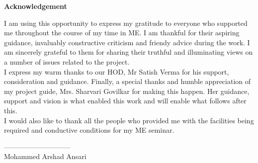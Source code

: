 \documentclass[12pt]{book}
\begin{document}
\begin{center}

	\vspace{30mm}
    \fontsize{24}{60}\selectfont \textbf{Acknowledgement}\\
    \vspace{20mm}

		
	\fontsize{12}{20}\selectfont \raggedright{I am using this opportunity to express my gratitude to everyone who supported me throughout the course of my time in ME. I am thankful for their aspiring guidance, invaluably constructive criticism and friendy advice during the work. I am sincerely grateful to them for sharing their truthful and illuminating views on a number of issues related to the project.}\\
    \vspace{10mm}
	I express my warm thanks to our HOD, Mr Satish Verma for his support, consideration and guidance.
	Finally, a special thanks and humble appreciation of my project guide, Mrs. Sharvari Govilkar for making this happen. Her guidance, support and vision is what enabled this work and will enable what follows after this. \\
    \vspace{10mm}
	I would also like to thank all the people who provided me with the facilities being required and conductive conditions for my ME seminar.

    \vspace{60mm}
    \noindent\hfill \fontsize{14}{20}\selectfont -----------------------------\\
    \noindent\hfill \fontsize{14}{20}\selectfont Mohammed Arshad Ansari
\end{center}
\end{document}
